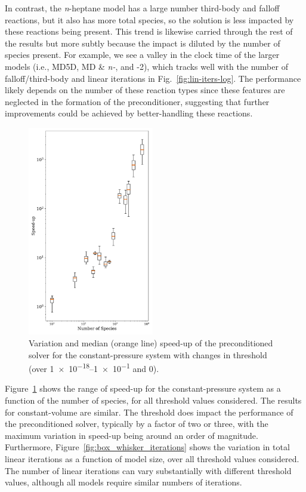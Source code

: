 \documentclass[twocolumn,10pt]{article}
\begin{document}
In contrast, the \textit{n}-heptane model has a large number third-body and falloff reactions, but it also has more total species, so the solution is less impacted by these reactions being present.
This trend is likewise carried through the rest of the results but more subtly because the impact is diluted by the number of species present.
For example, we see a valley in the clock time of the larger models (i.e., MD5D, MD \& \textit{n-}, and -2), which tracks well with the number of falloff/third-body and linear iterations in Fig.~\ref{fig:lin-iters-log}.
The performance likely depends on the number of these reaction types since these features are neglected in the formation of the preconditioner, suggesting that further improvements could be achieved by better-handling these reactions.

\begin{figure}[htb]
\centering
\includegraphics[width=0.49\textwidth]{figures/Threshold-BoxWhisker-pressure_problem.pdf}
\caption{Variation and median (orange line) speed-up of the preconditioned solver for the constant-pressure system with changes in threshold (over \numrange{1e-18}{1e-1} and 0).}
\label{fig:box_whisker}
\end{figure}


Figure~\ref{fig:box_whisker} shows the range of speed-up for the constant-pressure system as a function of the number of species, for all  threshold values considered.
The results for constant-volume are similar.
The threshold does impact the performance of the preconditioned solver, typically by a factor of two or three, with the maximum variation in speed-up being around an order of magnitude.
Furthermore, Figure~\ref{fig:box_whisker_iterations} shows the variation in total linear iterations as a function of model size, over all threshold values considered.
The number of linear iterations can vary substantially with different threshold values, although all models require similar numbers of iterations.
\end{document}
